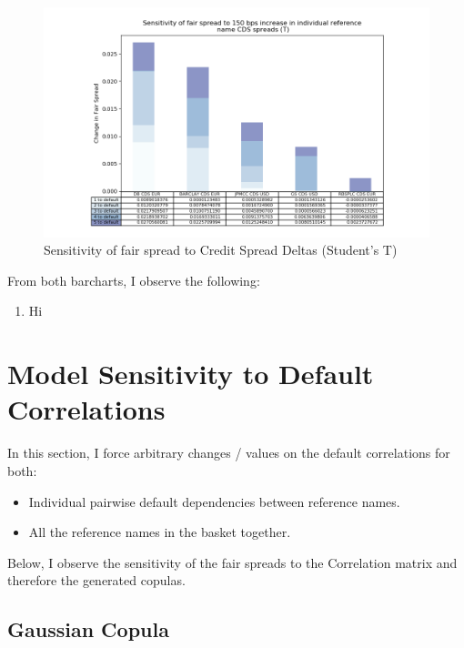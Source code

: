 \documentclass{report}
\theoremstyle{plain}
\theoremstyle{definition}
\begin{document}
\begin{figure}[H]
	\begin{center}
		\includegraphics[width=15cm]{Sensitivity_of_fair_spread_to_150_bps_increase_in_individual_reference_name_CDS_spreads_(T).png}
		\caption{Sensitivity of fair spread to Credit Spread Deltas (Student's T)} 
		\label{Sensitivity_of_fair_spread_to_150_bps_increase_in_individual_reference_name_CDS_spreads._(T)}
	\end{center}
\end{figure}

From both barcharts, I observe the following:
\begin{enumerate}
	\item Hi
\end{enumerate}


\section{Model Sensitivity to Default Correlations}

In this section, I force arbitrary changes / values on the default correlations for both:
\begin{itemize}
	\item Individual pairwise default dependencies between reference names.
	\item All the reference names in the basket together. 
\end{itemize}

Below, I observe the sensitivity of the fair spreads to the Correlation matrix and therefore the generated copulas.

\subsection{Gaussian Copula}
\end{document}
